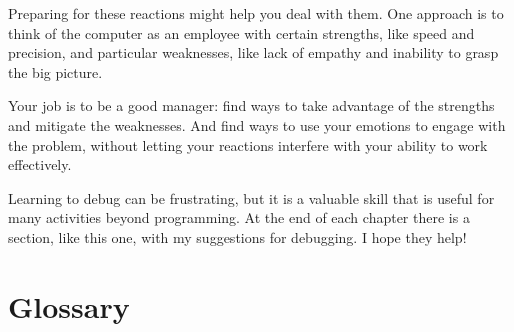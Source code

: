 \documentclass[10pt]{book}
\begin{document}
Preparing for these reactions might help you deal with them.
One approach is to think of the computer as an employee with
certain strengths, like speed and precision, and
particular weaknesses, like lack of empathy and inability
to grasp the big picture.

Your job is to be a good manager: find ways to take advantage
of the strengths and mitigate the weaknesses.  And find ways
to use your emotions to engage with the problem,
without letting your reactions interfere with your ability
to work effectively.

Learning to debug can be frustrating, but it is a valuable skill
that is useful for many activities beyond programming.  At the
end of each chapter there is a section, like this one,
with my suggestions for debugging.  I hope they help!


\section{Glossary}
\end{document}
